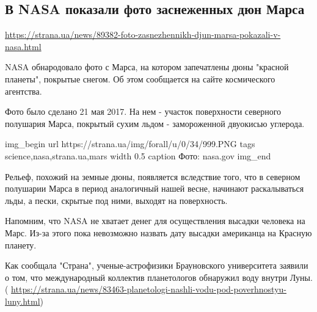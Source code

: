  
 

\subsection{В NASA показали фото заснеженных дюн Марса}

\url{https://strana.ua/news/89382-foto-zasnezhennikh-djun-marsa-pokazali-v-nasa.html}

NASA обнародовало фото с Марса, на котором запечатлены дюны "красной планеты",
покрытые снегом. Об этом сообщается на сайте космического агентства.

Фото было сделано 21 мая 2017. На нем - участок поверхности северного полушария
Марса, покрытый сухим льдом - замороженной двуокисью углерода.

\ifcmt
  img_begin 
    url https://strana.ua/img/forall/u/0/34/999.PNG
    tags science,nasa,strana.ua,mars
    width 0.5
    caption Фото: nasa.gov
  img_end
\fi

Рельеф, похожий на земные дюны, появляется вследствие того, что в северном
полушарии Марса в период аналогичный нашей весне, начинают раскалываться льды,
а пески, скрытые под ними, выходят на поверхность.

Напомним, что NASA не хватает денег для осуществления высадки человека на Марс.
Из-за этого пока невозможно назвать дату высадки американца на Красную планету.

Как сообщала "Страна", ученые-астрофизики Брауновского университета заявили о
том, что международный коллектив планетологов обнаружил воду внутри Луны.  (
\url{https://strana.ua/news/83463-planetologi-nashli-vodu-pod-poverhnostyu-luny.html})
